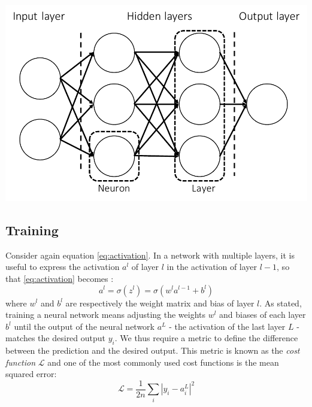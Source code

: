 \documentclass{Dissertate}
\let\origfigure\figure
\let\endorigfigure\endfigure
\renewenvironment{figure}[1][2] {
    \expandafter\origfigure\expandafter[H]
} {
    \endorigfigure
}
\begin{document}
\begin{figure}
\hypertarget{fig:neuralnetwork}{%
\centering
\includegraphics{source/figures/pdf/neuralnetwork.pdf}
\caption{Schematic overview of a neural network. The left layer is known
as the input layer, the right layer as the output layer and the layers
inbetween are referred to as hidden layers.}\label{fig:neuralnetwork}
}
\end{figure}

\hypertarget{training}{%
\subsection{Training}\label{training}}

Consider again equation \ref{eq:activation}. In a network with
multiple layers, it is useful to express the activation \(a^l\) of layer
\(l\) in the activation of layer \(l-1\), so that
\ref{eq:activation} becomes : \begin{equation}
a^l = \sigma(z^l) = \sigma(w^la^{l-1}+b^l)
\label{eq:weighted_input}\end{equation} where \(w^l\) and \(b^l\) are
respectively the weight matrix and bias of layer \(l\). As stated,
training a neural network means adjusting the weights \(w^l\) and biases
of each layer \(b^{l}\) until the output of the neural network \(a^L\) -
the activation of the last layer \(L\) - matches the desired output
\(y_i\). We thus require a metric to define the difference between the
prediction and the desired output. This metric is known as the
\emph{cost function} \(\mathcal{L}\) and one of the most commonly used
cost functions is the mean squared error: \begin{equation}
\mathcal{L} = \frac{1}{2n}\sum_i|y_i-a^L_i|^2
\label{eq:MSE}\end{equation}
\end{document}
